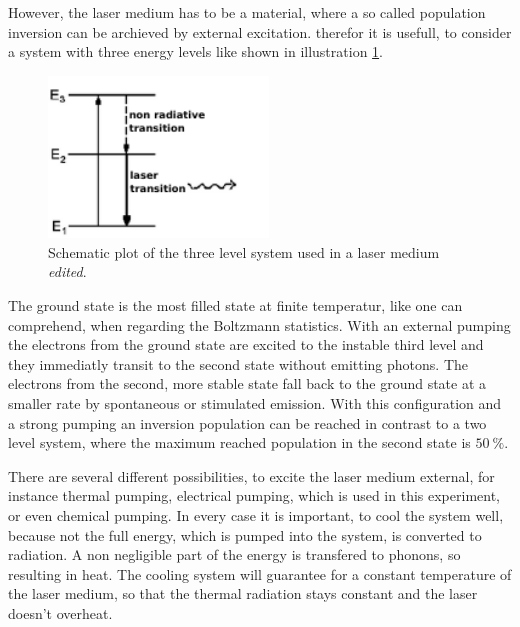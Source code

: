 However, the laser medium has to be a material, where a so called population inversion can be archieved by external excitation.
therefor it is usefull, to consider a system with three energy levels like shown in illustration \ref{fig:threelevelsystem}.
\begin{figure}
  \centering
  \includegraphics[height = 4.3cm]{Ordnername/threelevel_edit.pdf}
  \caption{Schematic plot of the three level system used in a laser medium \cite{threelevel} \textit{edited}.}
  \label{fig:threelevelsystem}
\end{figure}
The ground state is the most filled state at finite temperatur, like one can comprehend, when regarding the Boltzmann statistics.
With an external pumping the electrons from the ground state are excited to the instable third level and they immediatly transit to the second state
without emitting photons. The electrons from the second, more stable state fall back to the ground state at a smaller rate by spontaneous or stimulated emission.
With this configuration and a strong pumping an inversion population can be reached in contrast
to a two level system, where the maximum reached population in the second state is $\SI{50}{\percent}$.

There are several different possibilities, to excite the laser medium external, for instance thermal pumping,
electrical pumping, which is used in this experiment, or even chemical pumping.
In every case it is important, to cool the system well, because not the full energy, which is pumped into the system,
is converted to radiation. A non negligible part of the energy is transfered to phonons, so resulting in heat.
The cooling system will guarantee for a constant temperature of the laser medium, so that the thermal radiation stays constant
and the laser doesn't overheat.

